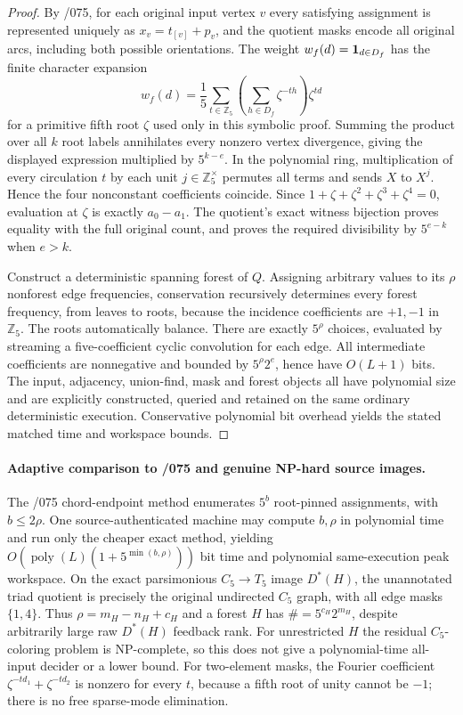 \documentclass[11pt]{article}
\begin{document}
\begin{proof}
By /075, for each original input vertex $v$ every satisfying
assignment is represented uniquely as $x_v=t_{[v]}+p_v$,
and the quotient masks encode all original arcs, including both
possible orientations. The weight
$w_f(d)={\bf1}_{d\in D_f}$ has the finite character expansion
\[
 w_f(d)=\frac15\sum_{t\in\mathbb Z_5}
  \left(\sum_{h\in D_f}\zeta^{-th}\right)\zeta^{td}
\]
for a primitive fifth root $\zeta$ used only in this symbolic proof.
Summing the product over all $k$ root labels annihilates every
nonzero vertex divergence, giving the displayed expression multiplied
by $5^{k-e}$. In the polynomial ring, multiplication of every
circulation $t$ by each unit $j\in\mathbb Z_5^\times$ permutes
all terms and sends $X$ to $X^j$. Hence the four nonconstant
coefficients coincide. Since
$1+\zeta+\zeta^2+\zeta^3+\zeta^4=0$,
evaluation at $\zeta$ is exactly $a_0-a_1$.
The quotient's exact witness bijection proves equality with the full
original count, and proves the required divisibility by
$5^{e-k}$ when $e>k$.

Construct a deterministic spanning forest of $Q$.
Assigning arbitrary values to its $\rho$ nonforest edge
frequencies, conservation recursively determines every forest
frequency, from leaves to roots, because the incidence coefficients
are $+1,-1$ in $\mathbb Z_5$.
The roots automatically balance. There are exactly $5^\rho$
choices, evaluated by streaming a five-coefficient cyclic convolution
for each edge. All intermediate coefficients are nonnegative and
bounded by $5^\rho2^e$, hence have $O(L+1)$ bits.
The input, adjacency, union-find, mask and forest objects all have
polynomial size and are explicitly constructed, queried and retained
on the same ordinary deterministic execution. Conservative polynomial
bit overhead yields the stated matched time and workspace bounds.
\end{proof}

\paragraph{Adaptive comparison to /075 and genuine NP-hard source images.}
The /075 chord-endpoint method enumerates $5^b$ root-pinned
assignments, with $b\le2\rho$. One source-authenticated
machine may compute $b,\rho$ in polynomial time and run only the
cheaper exact method, yielding
$O(\operatorname{poly}(L)(1+5^{\min(b,\rho)}))$ bit time and
polynomial same-execution peak workspace.
On the exact parsimonious $C_5\to T_5$ image $D^*(H)$,
the unannotated triad quotient is precisely the original
undirected $C_5$ graph, with all edge masks $\{1,4\}$.
Thus $\rho=m_H-n_H+c_H$ and a forest $H$ has
$\#=5^{c_H}2^{m_H}$, despite arbitrarily large raw
$D^*(H)$ feedback rank. For unrestricted $H$ the residual
$C_5$-coloring problem is NP-complete, so this does not give a
polynomial-time all-input decider or a lower bound.
For two-element masks, the Fourier coefficient
$\zeta^{-td_1}+\zeta^{-td_2}$ is nonzero for every $t$,
because a fifth root of unity cannot be $-1$; there is
no free sparse-mode elimination.
\end{document}
